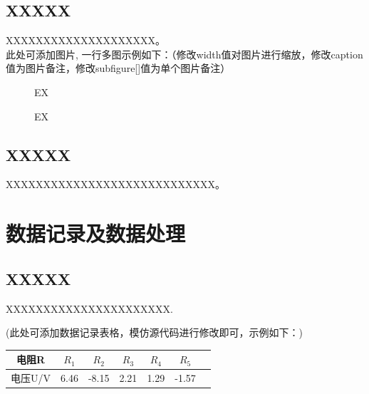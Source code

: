 \documentclass[UTF8]{ctexart}
\begin{document}
\subsection{XXXXX}
XXXXXXXXXXXXXXXXXXXX。\\
此处可添加图片, 一行多图示例如下：（修改width值对图片进行缩放，修改caption值为图片备注，修改subfigure[]值为单个图片备注）\\
\begin{figure}[htbp]
  \centering
  \caption{EX}
  \label{fig:multi-image-demo}
\end{figure}
\begin{figure}[htbp]
  \centering
  \caption{EX}
  \label{fig:multi-image-demo}
\end{figure}

\subsection{XXXXX}
XXXXXXXXXXXXXXXXXXXXXXXXXXXX。

\newpage

\section{数据记录及数据处理}
\subsection{XXXXX}
XXXXXXXXXXXXXXXXXXXXXX.
\begin{center}
(此处可添加数据记录表格，模仿源代码进行修改即可，示例如下：)\\
\vspace{1em}
\begin{tabular}{|c|c|c|c|c|c|c|}
 \hline
电阻R & $R_1$ & $R_2$ & $R_3$ & $R_4$ & $R_5$\\
 \hline
电压U/V & 6.46 & -8.15 & 2.21 & 1.29 & -1.57\\
 \hline
\end{tabular}
\end{center}
\end{document}
